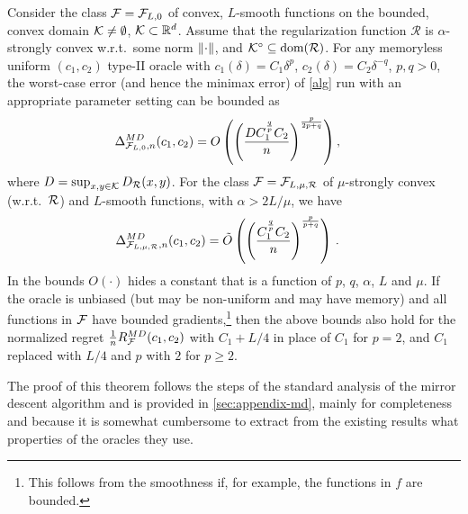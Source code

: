 \begin{theorem}
\label{thm:ub}
Consider the class $\mathcal{F}=\mathcal{F}_{L,0}$ of convex, $L$-smooth functions on the bounded, convex domain $\mathcal{K}\ne \emptyset$, $\mathcal{K} \subset \mathbb{R}^d$. 
Assume that the regularization function $\mathcal{R}$ is $\alpha$-strongly convex w.r.t.\  some norm $\left\|\cdot\right\|$, and $\mathcal{K}^\circ\subseteq \operatorname{dom}(\mathcal{R})$.
For any memoryless uniform $(c_1,c_2)$ type-II oracle 
with $c_1(\delta) = C_1 \delta^p$, $c_2(\delta) = C_2 \delta^{-q}$, $p,q>0$, 
the worst-case error (and hence the minimax error) of \cref{alg} run with an appropriate parameter setting
can be bounded as 
 \begin{align}
 \label{eq:MDbound1}
 \Delta_{\mathcal{F}_{L,0},n}^{MD}(c_1,c_2) 
 &= O\left(\left(\dfrac{DC_1^{\frac{q}{p}}C_2}{n}\right)^{\frac{p}{2p+q}}\right),
 \end{align}
 where $D=\sup_{x,y\in \mathcal{K}} D_{\mathcal{R}}(x,y)$.
 For the class $\mathcal{F}=\mathcal{F}_{L,\mu,\mathcal{R}}$ of $\mu$-strongly convex (w.r.t.\  $\mathcal{R}$) and $L$-smooth functions, with $\alpha >2L/\mu$, 
we have
\begin{align}
\Delta_{\F_{L,\mu,\cR},n}^{MD}(c_1,c_2) 
& %
=  \tilde{O}\left( \left(\dfrac{C_1^{\frac{q}{p}} C_2}{n} \right)^{\frac{p}{p+q}} \right)\,.
\label{eq:MDbound2}
\end{align}
In the bounds $O(\cdot)$ hides a constant that is a function of $p$, $q$, $\alpha$, $L$ and $\mu$.%
If the oracle is unbiased (but may be non-uniform and may have memory) and all functions in $\mathcal{F}$ have bounded gradients,\footnote{This follows from the smoothness if, for example, the functions in $f$  are bounded.} then the above bounds also hold for the normalized regret $\tfrac{1}{n} R_{\mathcal{F}}^{MD}(c_1,c_2)$ with $C_1+L/4$ in place of $C_1$ for $p=2$, and $C_1$ replaced with $L/4$ and $p$ with $2$ for $p \ge 2$.
\end{theorem}
The proof of this theorem follows the steps of the standard analysis of the mirror descent algorithm
 and is provided in \cref{sec:appendix-md}, mainly for completeness 
 and because it is somewhat cumbersome to extract from the existing results what properties of the oracles they use.

